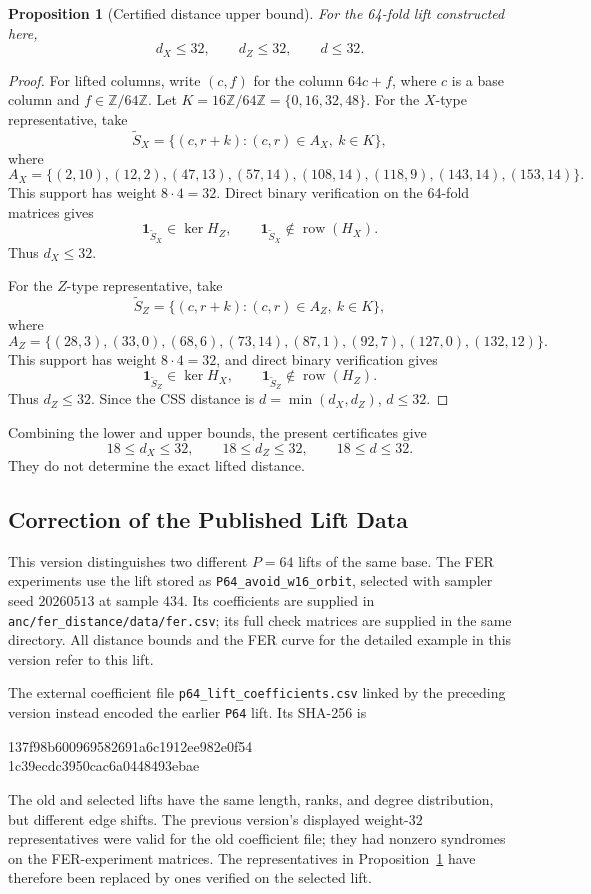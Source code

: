 \documentclass[11pt,a4paper]{article}
\newcommand{\HX}{H_X}
\newcommand{\HZ}{H_Z}
\newcommand{\vect}[1]{\bm{#1}}
\newcommand{\row}{\operatorname{row}}
\newcommand{\kerop}{\operatorname{ker}}
\theoremstyle{uprighttheorem}
\newtheorem{proposition}{Proposition}
\begin{document}
\begin{proposition}[Certified distance upper bound]\label{prop:verified-distance-upper-bound}
For the 64-fold lift constructed here,
\[
  d_X \le 32,
  \qquad
  d_Z \le 32,
  \qquad
  d \le 32.
\]
\end{proposition}

\begin{proof}
For lifted columns, write \((c,f)\) for the column \(64c+f\), where \(c\) is a base column and \(f\in\mathbb Z/64\mathbb Z\).
Let \(K=16\mathbb Z/64\mathbb Z=\{0,16,32,48\}\).
For the \(X\)-type representative, take
\[
  \widetilde S_X
  =
  \{(c,r+k): (c,r)\in A_X,\ k\in K\},
\]
where
\[
  A_X=\{(2,10),(12,2),(47,13),(57,14),(108,14),(118,9),(143,14),(153,14)\}.
\]
This support has weight \(8\cdot4=32\).
Direct binary verification on the 64-fold matrices gives
\[
  \vect{1}_{\widetilde S_X}\in\kerop \HZ,
  \qquad
  \vect{1}_{\widetilde S_X}\notin \row(\HX).
\]
Thus \(d_X\le32\).

For the \(Z\)-type representative, take
\[
  \widetilde S_Z
  =
  \{(c,r+k): (c,r)\in A_Z,\ k\in K\},
\]
where
\[
  A_Z=\{(28,3),(33,0),(68,6),(73,14),(87,1),(92,7),(127,0),(132,12)\}.
\]
This support has weight \(8\cdot4=32\), and direct binary verification gives
\[
  \vect{1}_{\widetilde S_Z}\in\kerop \HX,
  \qquad
  \vect{1}_{\widetilde S_Z}\notin \row(\HZ).
\]
Thus \(d_Z\le32\).
Since the CSS distance is \(d=\min(d_X,d_Z)\), \(d\le32\).
\end{proof}

Combining the lower and upper bounds, the present certificates give
\[
  18\le d_X\le32,
  \qquad
  18\le d_Z\le32,
  \qquad
  18\le d\le32.
\]
They do not determine the exact lifted distance.

\subsection{Correction of the Published Lift Data}\label{subsec:lift-data-correction}
This version distinguishes two different $P=64$ lifts of the same base.
The FER experiments use the lift stored as \texttt{P64\_avoid\_w16\_orbit}, selected with sampler seed $20260513$ at sample $434$.
Its coefficients are supplied in \texttt{anc/fer\_distance/data/fer.csv}; its full check matrices are supplied in the same directory.
All distance bounds and the FER curve for the detailed example in this version refer to this lift.

The external coefficient file \texttt{p64\_lift\_coefficients.csv} linked by the preceding version instead encoded the earlier \texttt{P64} lift.
Its SHA-256 is
\begin{center}\footnotesize\ttfamily
137f98b600969582691a6c1912ee982e0f54\\
1c39ecdc3950cac6a0448493ebae
\end{center}
The old and selected lifts have the same length, ranks, and degree distribution, but different edge shifts.
The previous version's displayed weight-$32$ representatives were valid for the old coefficient file; they had nonzero syndromes on the FER-experiment matrices.
The representatives in Proposition~\ref{prop:verified-distance-upper-bound} have therefore been replaced by ones verified on the selected lift.
\end{document}
